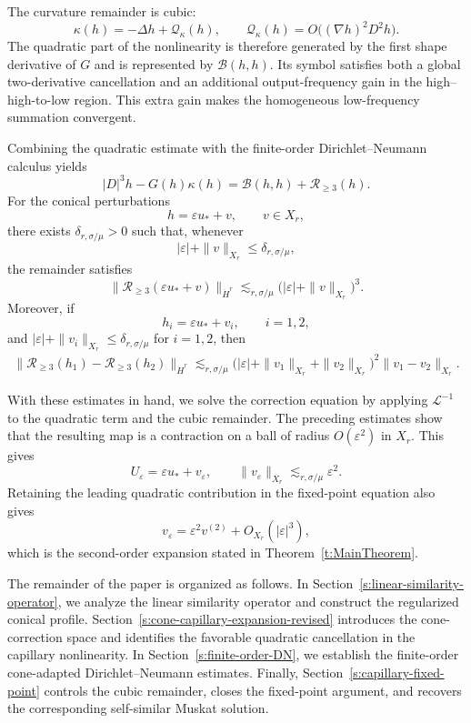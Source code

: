 \documentclass[12pt]{amsart}
\theoremstyle{remark}
\theoremstyle{definition}
\numberwithin{equation}{section}
\begin{document}
The curvature remainder is cubic:
\[
 \kappa(h) = -\Delta h+\mathcal Q_\kappa(h),
 \qquad \mathcal Q_\kappa(h) = O\bigl((\nabla h)^2D^2h\bigr).
\]
The quadratic part of the nonlinearity is therefore generated by the first shape derivative of \(G\) and is represented by \(\mathcal B(h,h)\). Its symbol satisfies both a global two-derivative cancellation and an additional output-frequency gain in the high--high-to-low region. 
This extra gain makes the homogeneous low-frequency summation convergent.

Combining the quadratic estimate with the finite-order Dirichlet--Neumann calculus yields
\[
 |D|^3h-G(h)\kappa(h) = \mathcal B(h,h)+\mathscr R_{\geq3}(h).
\]
For the conical perturbations
\[
 h=\varepsilon u_*+v, \qquad v\in X_r,
\]
there exists \(\delta_{r,\sigma/\mu}>0\) such that, whenever
\[
 |\varepsilon|+\|v\|_{X_r}\leq\delta_{r,\sigma/\mu},
\]
the remainder satisfies
\begin{equation}
\label{eq:intro-cubic-remainder}
 \|\mathscr R_{\geq3}(\varepsilon u_*+v)\|_{\dot H^r}
 \lesssim_{r,\sigma/\mu} \bigl( |\varepsilon|+\|v\|_{X_r}
 \bigr)^3.
\end{equation}
Moreover, if
\[
 h_i=\varepsilon u_*+v_i,
 \qquad i=1,2,
\]
and \(|\varepsilon|+\|v_i\|_{X_r}\leq\delta_{r,\sigma/\mu}\) for \(i=1,2\),
then
\begin{align}
\label{eq:intro-cubic-remainder-difference}
\|\mathscr R_{\geq3}(h_1)
       -\mathscr R_{\geq3}(h_2)\|_{\dot H^r}\lesssim_{r,\sigma/\mu}
 \bigl(
  |\varepsilon|
  +\|v_1\|_{X_r}
  +\|v_2\|_{X_r}
 \bigr)^2
 \|v_1-v_2\|_{X_r}.
\end{align}


With these estimates in hand, we solve the correction equation by applying
\(\mathcal L^{-1}\) to the quadratic term and the cubic remainder.
The preceding estimates show that the resulting map is a contraction
on a ball of radius \(O(\varepsilon^2)\) in \(X_r\). This gives
\[
 U_\varepsilon
 =
 \varepsilon u_*+v_\varepsilon,
 \qquad
 \|v_\varepsilon\|_{X_r}
 \lesssim_{r,\sigma/\mu}
 \varepsilon^2.
\]
Retaining the leading quadratic contribution in the fixed-point equation
also gives
\[
 v_\varepsilon
 =
 \varepsilon^2v^{(2)}
 +
 O_{X_r}(|\varepsilon|^3),
\]
which is the second-order expansion stated in
Theorem~\ref{t:MainTheorem}.


The remainder of the paper is organized as follows.
In Section~\ref{s:linear-similarity-operator}, we analyze the linear
similarity operator and construct the regularized conical profile.
Section~\ref{s:cone-capillary-expansion-revised} introduces the
cone-correction space and identifies the favorable quadratic cancellation in
the capillary nonlinearity.
In Section~\ref{s:finite-order-DN}, we establish the finite-order
cone-adapted Dirichlet--Neumann estimates.
Finally, Section~\ref{s:capillary-fixed-point} controls the cubic
remainder, closes the fixed-point argument, and recovers the
corresponding self-similar Muskat solution.
\end{document}
